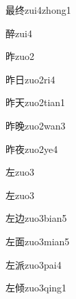 \begin{verbete}[12;8]{最终}{zui4zhong1}
\end{verbete}

\begin{verbete}[15]{醉}{zui4}
\end{verbete}

\begin{verbete}[9]{昨}{zuo2}
\end{verbete}

\begin{verbete}[9;4]{昨日}{zuo2ri4}
\end{verbete}

\begin{verbete}[9;4]{昨天}{zuo2tian1}
\end{verbete}

\begin{verbete}[9;11]{昨晚}{zuo2wan3}
\end{verbete}

\begin{verbete}[9;8]{昨夜}{zuo2ye4}
\end{verbete}

\begin{verbete}[5]{左}{zuo3}
\end{verbete}
\begin{verbete*}[5]{左}{zuo3}
\end{verbete*}

\begin{verbete}[5;5]{左边}{zuo3bian5}
\end{verbete}

\begin{verbete}[5;9]{左面}{zuo3mian5}
\end{verbete}

\begin{verbete}[5;9]{左派}{zuo3pai4}
\end{verbete}

\begin{verbete}[5;10]{左倾}{zuo3qing1}
\end{verbete}

